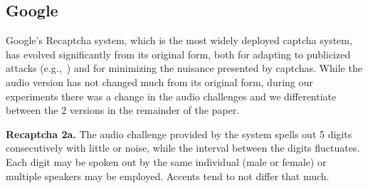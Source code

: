 \subsection{Google \re}
\label{sec:recaptcha}

Google's Recaptcha system, which is the most widely deployed captcha system,
has evolved significantly from its original form, both for adapting to publicized 
attacks (e.g.,~\cite{GoodfellowBIAS13}) and for minimizing the nuisance 
presented by captchas. While the audio version has not changed much from its original 
form, during our experiments there was a change in the audio challenges and we 
differentiate between the 2 versions in the remainder of the paper.


\textbf{Recaptcha 2a.} The audio challenge provided by the \re system spells out 5 digits
consecutively with little or noise, while the interval between the digits fluctuates. 
Each digit may be spoken out by the same individual (male or female) or multiple 
speakers may be employed. Accents tend to not differ that much.

%

